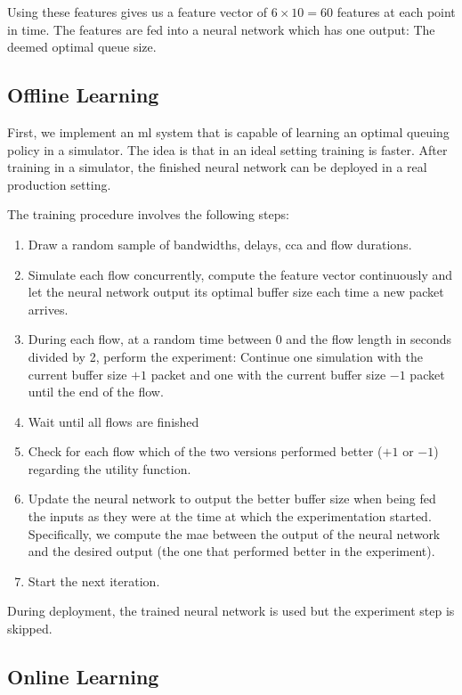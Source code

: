 \documentclass[10pt,sigconf,letterpaper,anonymous]{acmart}
\begin{document}
Using these features gives us a feature vector of $6\times 10 = 60$ features at each point in time. The features are fed into a neural network which has one output: The deemed optimal queue size.  

\subsection{Offline Learning}

First, we implement an \gls{ml} system that is capable of learning an optimal queuing policy in a simulator. The idea is that in an ideal setting training is faster. After training in a simulator, the finished neural network can be deployed in a real production setting. 

The training procedure involves the following steps:
\begin{enumerate}
\item Draw a random sample of bandwidths, delays, \gls{cca} and flow durations.
\item Simulate each flow concurrently, compute the feature vector continuously and let the neural network output its optimal buffer size each time a new packet arrives. 
\item During each flow, at a random time between 0 and the flow length in seconds divided by 2, perform the experiment: Continue one simulation with the current buffer size $+1$ packet and one with the current buffer size $-1$ packet until the end of the flow. 
\item Wait until all flows are finished
\item Check for each flow which of the two versions performed better ($+1$ or $-1$) regarding the utility function.
\item Update the neural network to output the better buffer size when being fed the inputs as they were at the time at which the experimentation started. Specifically, we compute the \gls{mae} between the output of the neural network and the desired output (the one that performed better in the experiment).
\item Start the next iteration. 
\end{enumerate}

During deployment, the trained neural network is used but the experiment step is skipped. 

\subsection{Online Learning}
\end{document}
